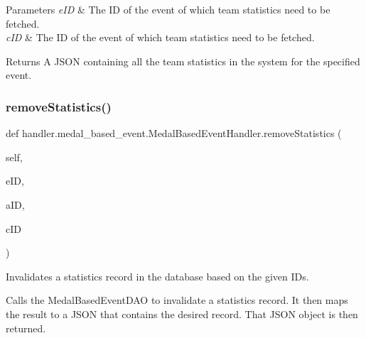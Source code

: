 \begin{DoxyParams}{Parameters}
{\em e\+ID} & The ID of the event of which team statistics need to be fetched. \\
\hline
{\em c\+ID} & The ID of the event of which team statistics need to be fetched.\\
\hline
\end{DoxyParams}
\begin{DoxyReturn}{Returns}
A J\+S\+ON containing all the team statistics in the system for the specified event. 
\end{DoxyReturn}
\mbox{\label{classhandler_1_1medal__based__event_1_1_medal_based_event_handler_a51117abdc0177b596a519761717625f5}} 
\subsubsection{\texorpdfstring{remove\+Statistics()}{removeStatistics()}}
{\footnotesize\ttfamily def handler.\+medal\+\_\+based\+\_\+event.\+Medal\+Based\+Event\+Handler.\+remove\+Statistics (\begin{DoxyParamCaption}\item[{}]{self,  }\item[{}]{e\+ID,  }\item[{}]{a\+ID,  }\item[{}]{c\+ID }\end{DoxyParamCaption})}



Invalidates a statistics record in the database based on the given I\+Ds. 

Calls the Medal\+Based\+Event\+D\+AO to invalidate a statistics record. It then maps the result to a J\+S\+ON that contains the desired record. That J\+S\+ON object is then returned.


